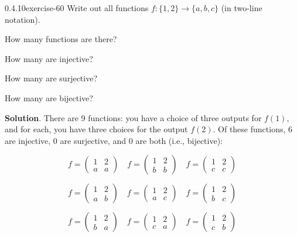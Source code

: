 \documentclass[twoside,11pt,]{book}
\numberwithin{equation}{chapter}
\newcommand{\twoline}[2]{\begin{pmatrix}#1 \\ #2 \end{pmatrix}}
\newcommand{\amp}{&}
\begin{document}
\begin{divisionsolution}{0.4.10}{}{exercise-60}%
\hypertarget{p-1045}{}%
Write out all functions \(f: \{1,2\} \to \{a,b,c\}\) (in two-line notation).%
\par
\hypertarget{p-1046}{}%
How many functions are there?%
\par
\hypertarget{p-1048}{}%
How many are injective?%
\par
\hypertarget{p-1050}{}%
How many are surjective?%
\par
\hypertarget{p-1052}{}%
How many are bijective?%
\par\smallskip%
\noindent\textbf{Solution}.\quad%
\hypertarget{p-1054}{}%
There are 9 functions: you have a choice of three outputs for \(f(1)\text{,}\) and for each, you have three choices for the output \(f(2)\text{.}\) Of these functions, 6 are injective, 0 are surjective, and 0 are both (i.e., bijective):%
\par
\hypertarget{p-1055}{}%
%
\begin{equation*}
f = \twoline{1 \amp 2}{a\amp a} \quad f = \twoline{1 \amp 2}{b \amp b} \quad f = \twoline{1 \amp 2}{c \amp c}
\end{equation*}
%
\par
\hypertarget{p-1056}{}%
%
\begin{equation*}
f = \twoline{1 \amp 2}{a\amp b} \quad f = \twoline{1 \amp 2}{a \amp c} \quad f = \twoline{1 \amp 2}{b \amp c}
\end{equation*}
%
\par
\hypertarget{p-1057}{}%
%
\begin{equation*}
f = \twoline{1 \amp 2}{b \amp a} \quad f = \twoline{1 \amp 2}{c \amp a} \quad f = \twoline{1 \amp 2}{c \amp b}
\end{equation*}
%
\end{divisionsolution}%
\end{document}
